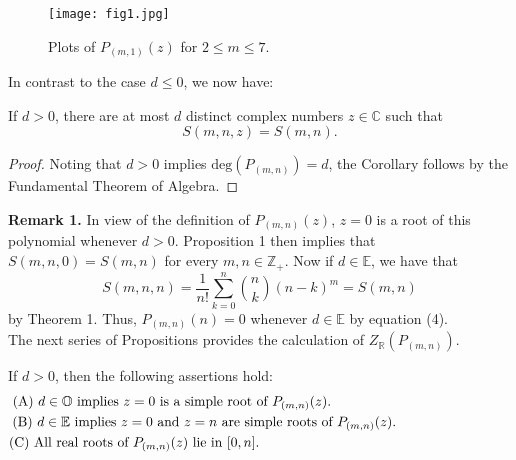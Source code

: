 \documentclass[]{amsart}
\begin{document}
\begin{figure}[h]
	\centering
	\texttt{[image: fig1.jpg]}
	\caption{Plots of $P_{(m,1)}(z)$ for $2 \leq m \leq 7$.}
\end{figure}
In contrast to the case $d \leq 0$, we now have:
\begin{cor}
If $d > 0$, there are at most $d$ distinct complex numbers $z \in \mathbb{C}$ such that 
\[ S(m,n,z) = S(m,n). \]
\end{cor}
\begin{proof}
Noting that $d > 0$ implies $\mathrm{deg}(P_{(m,n)}) = d$, the Corollary follows by the Fundamental Theorem of Algebra.
\end{proof}
\noindent
\textbf{Remark 1.}  In view of the definition of $P_{(m,n)}(z)$, $z = 0$ is a root of this polynomial whenever $d > 0$.  Proposition 1 then implies that $S(m,n,0) = S(m,n)$ for every $m,n \in \mathbb{Z}_{+}$.  Now if $d \in \mathbb{E}$, we have that
\[ S(m,n,n) = \frac{1}{n!}\sum_{k=0}^{n}{n \choose k}(n-k)^{m} = S(m,n) \]
by Theorem 1.  Thus, $P_{(m,n)}(n) = 0$ whenever $d \in \mathbb{E}$ by equation (4).
\\[12pt]
\indent
The next series of Propositions provides the calculation of $Z_{\mathbb{R}}(P_{(m,n)})$.
\begin{prop}
If $d > 0$, then the following assertions hold:
\begin{eqnarray}
\mbox{$\mathrm{(A)}$ $d \in \mathbb{O}$ implies $z = 0$ is a simple root of $P_{(m,n)}(z)$.} \hspace{42.5mm} & & \nonumber \\ \nonumber
\mbox{$\mathrm{(B)}$ $d \in \mathbb{E}$ implies $z = 0$ and $z = n$ are simple roots of $P_{(m,n)}(z)$.} \hspace{25.75mm} \nonumber \\ \nonumber
\mbox{$\mathrm{(C)}$ All real roots of $P_{(m,n)}(z)$ lie in $[0,n]$.} \hspace{61mm} & &  \nonumber
\end{eqnarray}
\end{prop}
\end{document}

